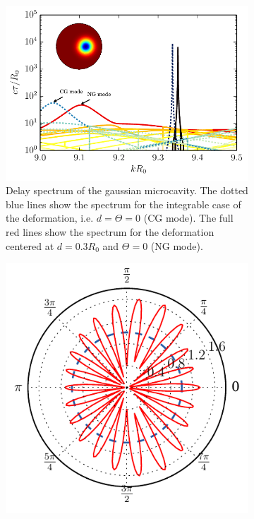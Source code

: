\begin{figure}
 \centering
 \begin{subfigure}{0.6\textwidth}
  \centering
  \includegraphics[width=\textwidth]{figs/passive/spectrum_gaussian_inset.pdf}
  \caption[Delay spectrum of the gaussian microcavity]
	  {Delay spectrum of the gaussian microcavity. The dotted blue lines show the spectrum
	  for the integrable case of the deformation, i.e. $d=\Theta=0$ (CG mode). The full red lines
	  show the spectrum for the deformation centered at $d=0.3R_0$ and $\Theta=0$ (NG mode).}
  \label{fig:passive.gaussian.numericalResults.spectrum}
 \end{subfigure}
 \begin{subfigure}{0.39\textwidth}
  \centering
  \includegraphics[width=\textwidth]{figs/passive/farField_gaussian.pdf}

\end{subfigure}
\end{figure}
